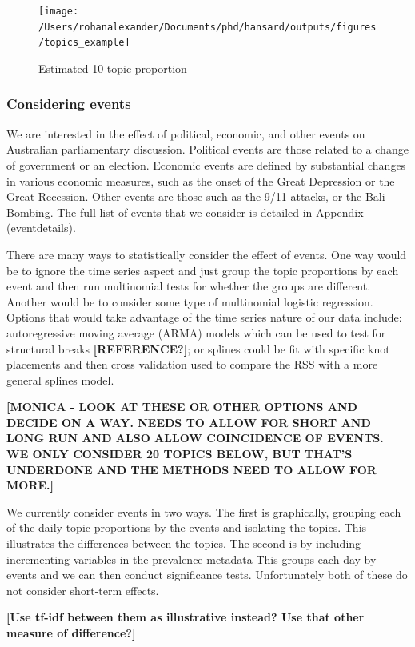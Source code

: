 \documentclass[12pt,]{article}
\theoremstyle{definition}
\theoremstyle{definition}
\theoremstyle{definition}
\theoremstyle{remark}
\begin{document}
\begin{figure}
\texttt{[image: /Users/rohanalexander/Documents/phd/hansard/outputs/figures/topics\_example]} \caption{Estimated 10-topic-proportion}\label{fig:exampletopics}
\end{figure}

\subsubsection{Considering events}\label{considering-events}

We are interested in the effect of political, economic, and other events
on Australian parliamentary discussion. Political events are those
related to a change of government or an election. Economic events are
defined by substantial changes in various economic measures, such as the
onset of the Great Depression or the Great Recession. Other events are
those such as the 9/11 attacks, or the Bali Bombing. The full list of
events that we consider is detailed in Appendix
\citet{ref}(eventdetails).

There are many ways to statistically consider the effect of events. One
way would be to ignore the time series aspect and just group the topic
proportions by each event and then run multinomial tests for whether the
groups are different. Another would be to consider some type of
multinomial logistic regression. Options that would take advantage of
the time series nature of our data include: autoregressive moving
average (ARMA) models which can be used to test for structural breaks
\textbf{{[}REFERENCE?{]}}; or splines could be fit with specific knot
placements and then cross validation used to compare the RSS with a more
general splines model.

\textbf{{[}MONICA - LOOK AT THESE OR OTHER OPTIONS AND DECIDE ON A WAY.
NEEDS TO ALLOW FOR SHORT AND LONG RUN AND ALSO ALLOW COINCIDENCE OF
EVENTS. WE ONLY CONSIDER 20 TOPICS BELOW, BUT THAT'S UNDERDONE AND THE
METHODS NEED TO ALLOW FOR MORE.{]}}

We currently consider events in two ways. The first is graphically,
grouping each of the daily topic proportions by the events and isolating
the topics. This illustrates the differences between the topics. The
second is by including incrementing variables in the prevalence metadata
This groups each day by events and we can then conduct significance
tests. Unfortunately both of these do not consider short-term effects.

\textbf{{[}Use tf-idf between them as illustrative instead? Use that
other measure of difference?{]}}
\end{document}

